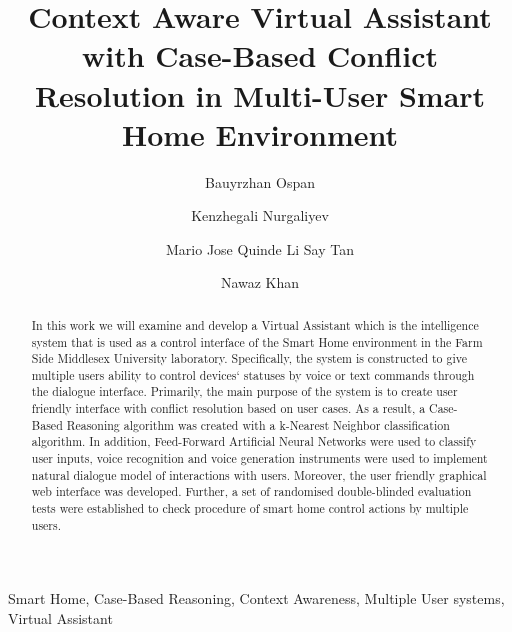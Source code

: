 \documentclass{llncs}
\begin{document}
    \title{Context Aware Virtual Assistant with
    Case-Based Conflict Resolution in
    Multi-User Smart Home Environment}
    \author{Bauyrzhan Ospan \and Kenzhegali Nurgaliyev \and Mario Jose Quinde Li Say Tan  \and Nawaz Khan }
    \maketitle
    \begin{abstract}
        In this work we will examine and develop a Virtual Assistant which is the intelligence system that is used as a control
        interface of the Smart Home environment in the Farm Side Middlesex University laboratory. Specifically, the system is
        constructed to give multiple users ability to control devices` statuses by voice or text commands through the dialogue
        interface. Primarily, the main purpose of the system is to create user friendly interface with conflict resolution based
        on user cases. As a result, a Case-Based Reasoning algorithm was created with a k-Nearest Neighbor classification algorithm.
        In addition, Feed-Forward Artificial Neural Networks were used to classify user inputs, voice
        recognition and voice generation instruments were used to implement natural dialogue model of interactions with users.
        Moreover, the user friendly graphical web interface was developed. Further, a set of randomised double-blinded
        evaluation tests were established to check procedure of smart home control actions by multiple users.
    \end{abstract}
    \begin{keywords}
        Smart Home, Case-Based Reasoning, Context Awareness, Multiple User systems, Virtual Assistant
    \end{keywords}
\end{document}
